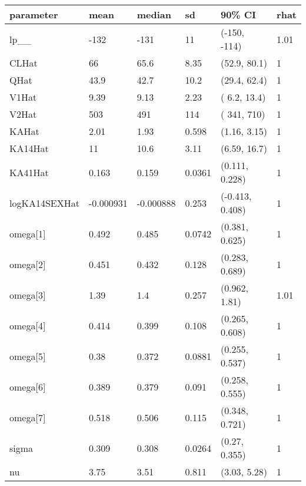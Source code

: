 
\begin{tabular}{l|l|l|l|l|l}
\hline
parameter & mean & median & sd & 90\% CI & rhat\\
\hline
lp\_\_ & -132 & -131 & 11 & (-150, -114) & 1.01\\
\hline
CLHat & 66 & 65.6 & 8.35 & (52.9, 80.1) & 1\\
\hline
QHat & 43.9 & 42.7 & 10.2 & (29.4, 62.4) & 1\\
\hline
V1Hat & 9.39 & 9.13 & 2.23 & ( 6.2, 13.4) & 1\\
\hline
V2Hat & 503 & 491 & 114 & ( 341,  710) & 1\\
\hline
KAHat & 2.01 & 1.93 & 0.598 & (1.16, 3.15) & 1\\
\hline
KA14Hat & 11 & 10.6 & 3.11 & (6.59, 16.7) & 1\\
\hline
KA41Hat & 0.163 & 0.159 & 0.0361 & (0.111, 0.228) & 1\\
\hline
logKA14SEXHat & -0.000931 & -0.000888 & 0.253 & (-0.413, 0.408) & 1\\
\hline
omega[1] & 0.492 & 0.485 & 0.0742 & (0.381, 0.625) & 1\\
\hline
omega[2] & 0.451 & 0.432 & 0.128 & (0.283, 0.689) & 1\\
\hline
omega[3] & 1.39 & 1.4 & 0.257 & (0.962, 1.81) & 1.01\\
\hline
omega[4] & 0.414 & 0.399 & 0.108 & (0.265, 0.608) & 1\\
\hline
omega[5] & 0.38 & 0.372 & 0.0881 & (0.255, 0.537) & 1\\
\hline
omega[6] & 0.389 & 0.379 & 0.091 & (0.258, 0.555) & 1\\
\hline
omega[7] & 0.518 & 0.506 & 0.115 & (0.348, 0.721) & 1\\
\hline
sigma & 0.309 & 0.308 & 0.0264 & (0.27, 0.355) & 1\\
\hline
nu & 3.75 & 3.51 & 0.811 & (3.03, 5.28) & 1\\
\hline
\end{tabular}
